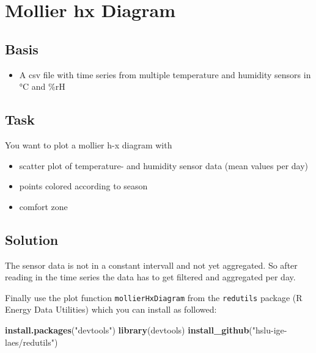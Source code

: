 \documentclass[
]{book}
\newenvironment{Shaded}{\begin{snugshade}}{\end{snugshade}}
\newcommand{\KeywordTok}[1]{\textcolor[rgb]{0.13,0.29,0.53}{\textbf{#1}}}
\newcommand{\NormalTok}[1]{#1}
\newcommand{\StringTok}[1]{\textcolor[rgb]{0.31,0.60,0.02}{#1}}
\providecommand{\tightlist}{%
  \setlength{\itemsep}{0pt}\setlength{\parskip}{0pt}}
\begin{document}
\hypertarget{mollier-hx-diagram}{%
\section{Mollier hx Diagram}\label{mollier-hx-diagram}}

\hypertarget{basis-1}{%
\subsection{Basis}\label{basis-1}}

\begin{itemize}
\tightlist
\item
  A csv file with time series from multiple temperature and humidity sensors in °C and \%rH
\end{itemize}

\hypertarget{task-1}{%
\subsection{Task}\label{task-1}}

You want to plot a mollier h-x diagram with

\begin{itemize}
\item
  scatter plot of temperature- and humidity sensor data (mean values per day)
\item
  points colored according to season
\item
  comfort zone
\end{itemize}

\hypertarget{solution-1}{%
\subsection{Solution}\label{solution-1}}

The sensor data is not in a constant intervall and not yet aggregated. So after reading in the time series the data has to get filtered and aggregated per day.

Finally use the plot function \texttt{mollierHxDiagram} from the \texttt{redutils} package (R Energy Data Utilities) which you can install as followed:

\begin{Shaded}
\begin{Highlighting}[]
\KeywordTok{install.packages}\NormalTok{(}\StringTok{"devtools"}\NormalTok{)}
\KeywordTok{library}\NormalTok{(devtools)}
\KeywordTok{install_github}\NormalTok{(}\StringTok{"hslu-ige-laes/redutils"}\NormalTok{)}
\end{Highlighting}
\end{Shaded}
\end{document}
